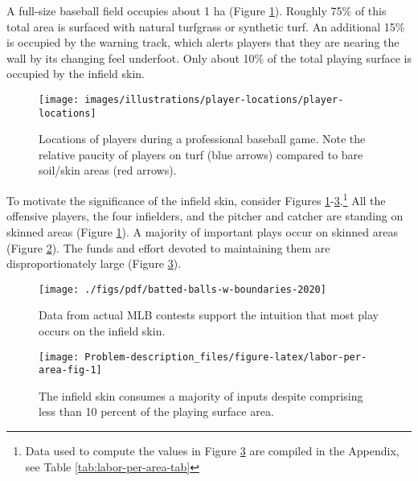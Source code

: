 \documentclass[
  letterpaper,
  openany]{book}
\begin{document}
A full-size baseball field occupies about 1 ha (Figure \ref{fig:player-locations}). Roughly 75\% of this total area is surfaced with natural turfgrass or synthetic turf.
An additional 15\% is occupied by the warning track, which alerts players that they are nearing the wall by its changing feel underfoot.
Only about 10\% of the total playing surface is occupied by the infield skin.

\begin{figure}[ptbh]

{\centering \texttt{[image: images/illustrations/player-locations/player-locations]} 

}

\caption[Locations of players during a professional baseball game]{Locations of players during a professional baseball game. Note the relative paucity of players on turf (blue arrows) compared to bare soil/skin areas (red arrows).}\label{fig:player-locations}
\end{figure}

To motivate the significance of the infield skin, consider Figures \ref{fig:player-locations}-\ref{fig:labor-per-area-fig}.\footnote{Data used to compute the values in Figure \ref{fig:labor-per-area-fig} are compiled in the Appendix, see Table \ref{tab:labor-per-area-tab}}
All the offensive players, the four infielders, and the pitcher and catcher are standing on skinned areas (Figure \ref{fig:player-locations}).
A majority of important plays occur on skinned areas (Figure \ref{fig:batted-ball-density}). The funds and effort devoted to maintaining them are disproportionately large (Figure \ref{fig:labor-per-area-fig}).

\begin{figure}[pthb]

{\centering \texttt{[image: ./figs/pdf/batted-balls-w-boundaries-2020]} 

}

\caption[Concentration of play on the infield skin]{Data from actual MLB contests support the intuition that most play occurs on the infield skin.}\label{fig:batted-ball-density}
\end{figure}

\begin{figure}[pthb]

{\centering \texttt{[image: Problem-description\_files/figure-latex/labor-per-area-fig-1]} 

}

\caption[Labor inputs for a professionally-managed infield skin]{The infield skin consumes a majority of inputs despite comprising less than 10 percent of the playing surface area.}\label{fig:labor-per-area-fig}
\end{figure}
\end{document}
